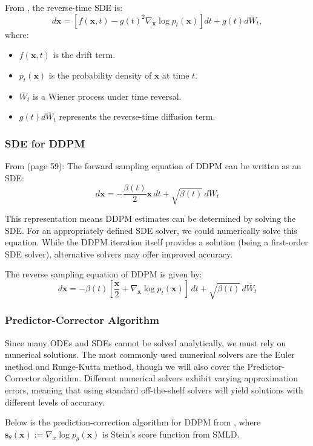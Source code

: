 \documentclass{article}
\newcommand{\x}{\mathbf{x}}
\begin{document}
	From \cite{anderson1982}, the reverse-time SDE is:
	$$
	d\x = \left[f(\x,t) - g(t)^2 \nabla_{\x} \log p_t(\x)\right]dt + g(t) d\overline{W}_t,
	$$
	where:
	\begin{itemize}
		\item $f(\x, t)$ is the drift term.
		\item $p_t(\x)$ is the probability density of $\x$ at time $t$.
		\item $\overline{W}_t$ is a Wiener process under time reversal.
		\item $g(t) d\overline{W}_t$ represents the reverse-time diffusion term.
	\end{itemize}
	
	\subsubsection*{SDE for DDPM}
	
	From \cite{chan2025} (page 59): The forward sampling equation of DDPM can be written as an SDE:
	$$
	d\x = -\frac{\beta(t)}{2} \x \, dt + \sqrt{\beta(t)} \, dW_t
	$$
	
	This representation means DDPM estimates can be determined by solving the SDE. For an appropriately defined SDE solver, we could numerically solve this equation. While the DDPM iteration itself provides a solution (being a first-order SDE solver), alternative solvers may offer improved accuracy.
	
	The reverse sampling equation of DDPM is given by:
	$$
	d\x = -\beta(t) \left[\frac{\x}{2} + \nabla_{\x} \log p_t(\x)\right] \, dt + \sqrt{\beta(t)} \, d\overline{W}_t
	$$
	
	\subsubsection*{Predictor-Corrector Algorithm}
	
	 Since many ODEs and SDEs cannot be solved analytically, we must rely on numerical solutions. The most commonly used numerical solvers are the Euler method and Runge-Kutta method, though we will also cover the Predictor-Corrector algorithm. Different numerical solvers exhibit varying approximation errors, meaning that using standard off-the-shelf solvers will yield solutions with different levels of accuracy. 
	 
	 Below is the prediction-correction algorithm for DDPM from \cite{song2021}, where $\boldsymbol{s}_\theta (\x) := \nabla_x \log p_\theta (\x)$ is Stein's score function from SMLD.
	 
\end{document}
